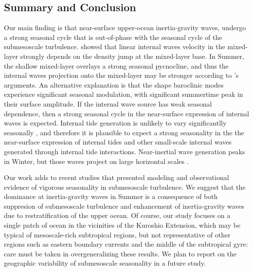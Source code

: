 \documentclass[grl]{agutex2015}
\begin{document}
\begin{article}
\section{Summary and Conclusion}
Our main finding is that
near-surface upper-ocean inertia-gravity waves, undergo
a strong seasonal cycle that is out-of-phase with the seasonal cycle of
the submesoscale turbulence. \cite{dasaro1978} showed that linear internal waves
velocity in the mixed-layer strongly depends on the density jump at the mixed-layer
base. In Summer, the shallow mixed-layer overlays a strong seasonal pycnocline,
and thus the internal waves projection onto the mixed-layer may be stronger
according to \cite{dasaro1978}'s arguments. An
alternative explanation is that the shape baroclinic modes experience significant
seasonal modulation, with significant summertime peak in their surface amplitude.
If the internal wave source has weak seasonal dependence, then a strong
seasonal cycle in the near-surface expression of internal waves is expected.
Internal tide generation is unlikely to vary significantlly seasonally \citep[e.g.,][]{alford2003},
and therefore it is plausible to expect a strong seasonality in the the near-surface
expression of internal tides and
other small-scale internal waves generated through internal tide interactions.
Near-inertial wave generation peaks in Winter, but those waves project on large
horizontal scales \citep[e.g, ][]{qi_etal1995}.

Our work adds to recent studies that presented modeling \cite{sasaki_etal2014}
and observational \citep{callies_etal2015,buckingham_etal2016} evidence of vigorous seasonality in
submesoscale turbulence. We suggest that the dominance at inertia-gravity waves in
Summer is a consequence of both suppresion of submesoscale turbulence and
enhancement of inertia-gravity waves due to restratification of
the upper ocean. Of course, our study focuses on a single patch of ocean in the
vicinities of the Kuroshio Extension, which may be typical of mesoscale-rich
subtropical regions, but not
representative of other regions such as eastern boundary currents
and the middle of the subtropical gyre: care must be taken in overgeneralizing
these results.  We plan to report on the geographic variability of submesoscale
 seasonality  in a future study.



\end{article}
\end{document}
